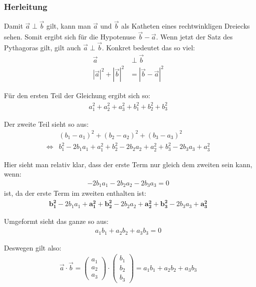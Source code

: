 \subsubsection{Herleitung}
\begin{flushleft}
Damit $\vec{a}\perp\vec{b}$ gilt, kann man $\vec{a}$ und $\vec{b}$ als Katheten eines rechtwinkligen Dreiecks sehen.
Somit ergibt sich für die Hypotenuse $\vec{b}-\vec{a}$.
Wenn jetzt der Satz des Pythagoras gilt, gilt auch $\vec{a}\perp\vec{b}$.
Konkret bedeutet das so viel:
\begin{align}
    \vec{a}&\perp\vec{b} \\
    |\vec{a}|^2+|\vec{b}|^2&=|\vec{b}-\vec{a}|^2
\end{align}

Für den ersten Teil der Gleichung ergibt sich so:
\begin{align}
    a_1^2+a_2^2+a_3^2+b_1^2+b_2^2+b_3^2
\end{align}

Der zweite Teil sieht so aus:
\begin{align}
    &\left(b_1-a_1\right)^2+\left(b_2-a_2\right)^2+\left(b_3-a_3\right)^2 \\
    \Leftrightarrow &b_1^2-2b_1a_1+a_1^2+b_2^2-2b_2a_2+a_2^2+b_3^2-2b_3a_3+a_3^2
\end{align}

Hier sieht man relativ klar, dass der erste Term nur gleich dem zweiten sein kann, wenn:
\begin{align}
    -2b_1a_1-2b_2a_2-2b_3a_3=0
\end{align}
ist, da der erste Term im zweiten enthalten ist:
\begin{align}
    \mathbf{b_1^2}-2b_1a_1+\mathbf{a_1^2}+\mathbf{b_2^2}-2b_2a_2+\mathbf{a_2^2}+\mathbf{b_3^2}-2b_3a_3+\mathbf{a_3^2}
\end{align}

Umgeformt sieht das ganze so aus:
\begin{align}
    a_1b_1+a_2b_2+a_3b_3=0
\end{align}

Deswegen gilt also:
\begin{align}
    \vec{a}\cdot\vec{b}=\begin{pmatrix} a_1 \\ a_2 \\ a_3 \end{pmatrix}\cdot\begin{pmatrix} b_1 \\ b_2 \\ b_3 \end{pmatrix}=a_1 b_1+a_2 b_2+a_3 b_3
\end{align}
\end{flushleft}

